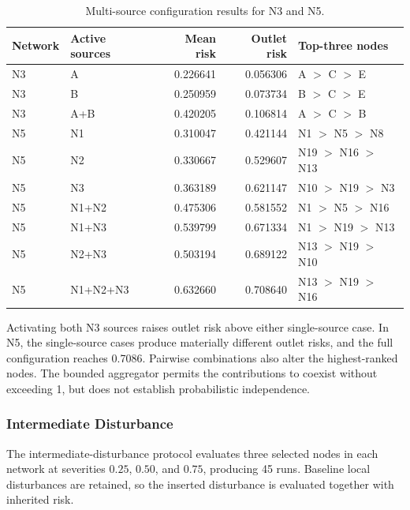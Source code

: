 \begin{table}[H]
\centering
\caption{Multi-source configuration results for N3 and N5.}
\label{tab:multi-source}
\small
\renewcommand{\arraystretch}{1.08}
\begin{tabular*}{\textwidth}{@{\extracolsep{\fill}}llrrl@{}}
\toprule
Network & Active sources & Mean risk & Outlet risk & Top-three nodes \\
\midrule
N3 & A & 0.226641 & 0.056306 & A $>$ C $>$ E \\
N3 & B & 0.250959 & 0.073734 & B $>$ C $>$ E \\
N3 & A+B & 0.420205 & 0.106814 & A $>$ C $>$ B \\
N5 & N1 & 0.310047 & 0.421144 & N1 $>$ N5 $>$ N8 \\
N5 & N2 & 0.330667 & 0.529607 & N19 $>$ N16 $>$ N13 \\
N5 & N3 & 0.363189 & 0.621147 & N10 $>$ N19 $>$ N3 \\
N5 & N1+N2 & 0.475306 & 0.581552 & N1 $>$ N5 $>$ N16 \\
N5 & N1+N3 & 0.539799 & 0.671334 & N1 $>$ N19 $>$ N13 \\
N5 & N2+N3 & 0.503194 & 0.689122 & N13 $>$ N19 $>$ N10 \\
N5 & N1+N2+N3 & 0.632660 & 0.708640 & N13 $>$ N19 $>$ N16 \\
\bottomrule
\end{tabular*}
\end{table}

Activating both N3 sources raises outlet risk above either single-source
case. In N5, the single-source cases produce materially different outlet
risks, and the full configuration reaches 0.7086. Pairwise combinations
also alter the highest-ranked nodes. The bounded aggregator permits the
contributions to coexist without exceeding 1, but does not establish
probabilistic independence.

\subsubsection{Intermediate Disturbance}

The intermediate-disturbance protocol evaluates three selected nodes in
each network at severities $0.25$, $0.50$, and $0.75$, producing 45
runs. Baseline local disturbances are retained, so the inserted
disturbance is evaluated together with inherited risk.

